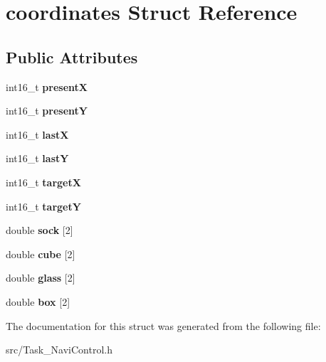 \hypertarget{structcoordinates}{\section{coordinates Struct Reference}
\label{structcoordinates}
}
\subsection*{Public Attributes}
\begin{DoxyCompactItemize}
\item 
\hypertarget{structcoordinates_a753f1070aba1754063b9b29454c6247e}{int16\-\_\-t {\bfseries present\-X}}\label{structcoordinates_a753f1070aba1754063b9b29454c6247e}

\item 
\hypertarget{structcoordinates_a8f1a4b792667472ddb2581952c1bf7a6}{int16\-\_\-t {\bfseries present\-Y}}\label{structcoordinates_a8f1a4b792667472ddb2581952c1bf7a6}

\item 
\hypertarget{structcoordinates_afb3664899a6250c9281705fa1bb9217e}{int16\-\_\-t {\bfseries last\-X}}\label{structcoordinates_afb3664899a6250c9281705fa1bb9217e}

\item 
\hypertarget{structcoordinates_a7bbd20a916d7327393bedb478b94561b}{int16\-\_\-t {\bfseries last\-Y}}\label{structcoordinates_a7bbd20a916d7327393bedb478b94561b}

\item 
\hypertarget{structcoordinates_a0edf158c037b7907e4325c5550d939b0}{int16\-\_\-t {\bfseries target\-X}}\label{structcoordinates_a0edf158c037b7907e4325c5550d939b0}

\item 
\hypertarget{structcoordinates_a609c2815e764d28b1d294c990f255a50}{int16\-\_\-t {\bfseries target\-Y}}\label{structcoordinates_a609c2815e764d28b1d294c990f255a50}

\item 
\hypertarget{structcoordinates_a5cfd44ab7fd2781d24c04034f22cf112}{double {\bfseries sock} \mbox{[}2\mbox{]}}\label{structcoordinates_a5cfd44ab7fd2781d24c04034f22cf112}

\item 
\hypertarget{structcoordinates_af07bdd7061e25fbbd4f3543039df51d2}{double {\bfseries cube} \mbox{[}2\mbox{]}}\label{structcoordinates_af07bdd7061e25fbbd4f3543039df51d2}

\item 
\hypertarget{structcoordinates_a3ceffeea4ae531132a6b2cfbdba91eae}{double {\bfseries glass} \mbox{[}2\mbox{]}}\label{structcoordinates_a3ceffeea4ae531132a6b2cfbdba91eae}

\item 
\hypertarget{structcoordinates_a3d1dacb760f81f8f68d3f9616df2f793}{double {\bfseries box} \mbox{[}2\mbox{]}}\label{structcoordinates_a3d1dacb760f81f8f68d3f9616df2f793}

\end{DoxyCompactItemize}


The documentation for this struct was generated from the following file\-:\begin{DoxyCompactItemize}
\item 
src/Task\-\_\-\-Navi\-Control.\-h\end{DoxyCompactItemize}
